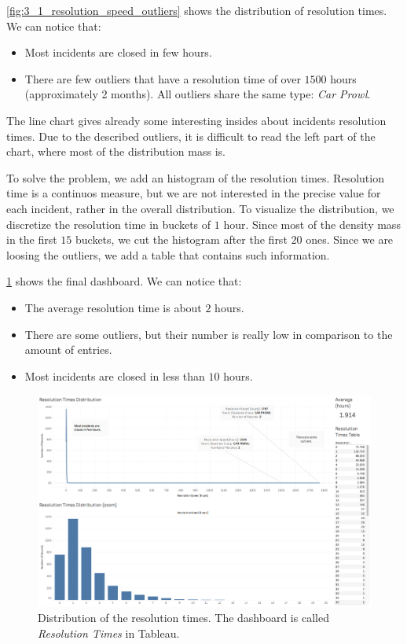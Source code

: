 \cref{fig:3_1_resolution_speed_outliers} shows the distribution of resolution times.
We can notice that:
\begin{itemize}
    \item Most incidents are closed in few hours.
    \item There are few outliers that have a resolution time of over $1500$ hours (approximately 2 months). All outliers share the same type: \textit{Car Prowl}.
\end{itemize}

The line chart gives already some interesting insides about incidents resolution times.
Due to the described outliers, it is difficult to read the left part of the chart, where most of the distribution mass is.

To solve the problem, we add an histogram of the resolution times.
Resolution time is a continuos measure, but we are not interested in the precise value for each incident, rather in the overall distribution.
To visualize the distribution, we discretize the resolution time in buckets of $1$ hour.
Since most of the density mass in the first $15$ buckets, we cut the histogram after the first $20$ ones.
Since we are loosing the outliers, we add a table that contains such information.

\cref{fig:3_1_resolution_speed} shows the final dashboard.
We can notice that:
\begin{itemize}
    \item The average resolution time is about $2$ hours.
    \item There are some outliers, but their number is really low in comparison to the amount of entries.
    \item Most incidents are closed in less than $10$ hours.
\end{itemize}

\begin{figure}[h]
	\centering
	\includegraphics[width=\columnwidth]{figures/3_1_resolution_speed}
	\caption{Distribution of the resolution times. The dashboard is called \textit{Resolution Times} in Tableau.}
	\label{fig:3_1_resolution_speed}
\end{figure}


